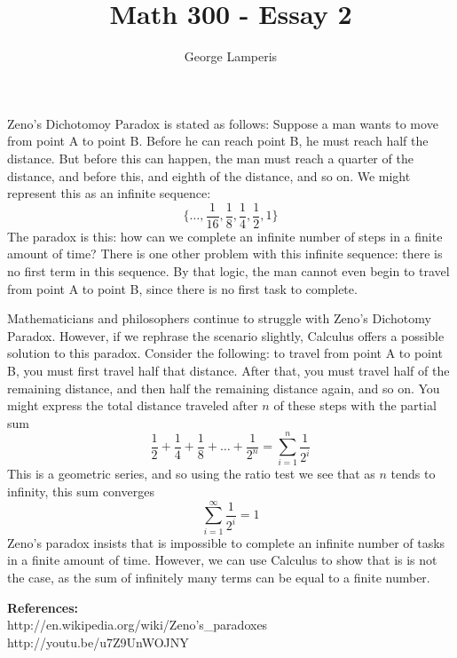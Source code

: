 \documentclass[12pt]{article}
\title{Math 300 - Essay 2}
\author{George Lamperis}
\date{}
\theoremstyle{mystyle}
\begin{document}
\maketitle

Zeno's Dichotomoy Paradox is stated as follows: Suppose a man wants to move from
point A to point B. Before he can reach point B, he must reach half the
distance. But before this can happen, the man must reach a quarter of the
distance, and before this, and eighth of the distance, and so on. We might
represent this as an infinite sequence:
$$ 
\{ \ldots, \frac{1}{16}, \frac{1}{8}, \frac{1}{4}, \frac{1}{2}, 1 \} 
$$
The paradox is this: how can we complete an infinite number of steps in a finite
amount of time? There is one other problem with this infinite sequence: there is
no first term in this sequence. By that logic, the man cannot even begin to
travel from point A to point B, since there is no first task to complete.

Mathematicians and philosophers continue to struggle with Zeno's
Dichotomy Paradox. However, if we rephrase the scenario slightly, Calculus
offers a possible solution to this paradox. Consider the following: to travel
from point A to point B, you must first travel half that distance. After that,
you must travel half of the remaining distance, and then half the remaining
distance again, and so on. You might express the total distance traveled
after $n$ of these steps with the partial sum
$$
\frac{1}{2} + \frac{1}{4} + \frac{1}{8} + \ldots + \frac{1}{2^n} = \sum_{i=1}^n \frac{1}{2^i} 
$$
This is a geometric series, and so using the ratio test we see that as $n$ tends
to infinity, this sum converges
$$
\sum_{i=1}^\infty \frac{1}{2^i} = 1
$$
Zeno's paradox insists that is impossible to complete an infinite number of
tasks in a finite amount of time. However, we can use Calculus to show
that is is not the case, as the sum of infinitely many terms can be
equal to a finite number.

\noindent \textbf{References:} \\
http://en.wikipedia.org/wiki/Zeno's\_paradoxes \\
http://youtu.be/u7Z9UnWOJNY
\end{document}
